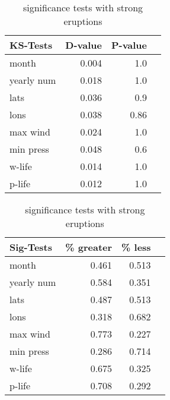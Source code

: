\begin{table}[!tbp]
\centering
\begin{minipage}[b]{0.45\textwidth}
\begin{tabular}{lrrr}
\toprule
             KS-Tests & D-value & P-value \\
\midrule
month & 0.004 & 1.0 \\
yearly num & 0.018 & 1.0 \\
lats & 0.036 & 0.9 \\
lons & 0.038 & 0.86 \\
max wind & 0.024 & 1.0 \\
min press & 0.048 & 0.6 \\
w-life & 0.014 & 1.0 \\
p-life & 0.012 & 1.0 \\

\bottomrule
\end{tabular}
\caption{ks-tests with strong eruptions}
\label{ks_10}
\end{minipage}
\hfill
\begin{minipage}[b]{0.45\textwidth}
\begin{tabular}{lrrr}
\toprule
             Sig-Tests & \% greater & \% less \\
\midrule

month & 0.461 & 0.513 \\
yearly num & 0.584 & 0.351 \\
lats & 0.487 & 0.513 \\
lons & 0.318 & 0.682 \\
max wind & 0.773 & 0.227 \\
min press & 0.286 & 0.714 \\
w-life & 0.675 & 0.325 \\
p-life & 0.708 & 0.292 \\

\bottomrule
\end{tabular}
\caption{significance tests with strong eruptions}
\label{sig_10}
\end{minipage}
\end{table}


